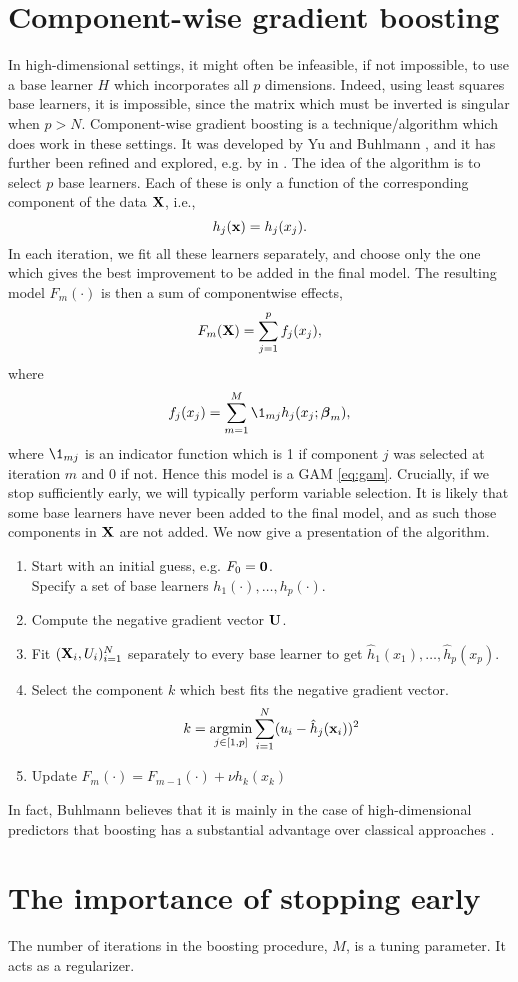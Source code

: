\section{Component-wise gradient boosting}
In high-dimensional settings, it might often be infeasible, if not impossible, to use a base learner $H$ which incorporates all $p$ dimensions. Indeed, using least squares base learners, it is impossible, since the matrix which must be inverted is singular when $p>N$. Component-wise gradient boosting is a technique/algorithm which does work in these settings. It was developed by Yu and Buhlmann \citep{buhlmann-yu}, and it has further been refined and explored, e.g. by \citeauthor{buhlmann2006} in \citeyear{buhlmann2006} \citep{buhlmann2006}. The idea of the algorithm is to select $p$ base learners. Each of these is only a function of the corresponding component of the data $\mathbf{X}$, i.e.,
\begin{equation*}
    h_j(\mathbf{x})=h_j(x_j).
\end{equation*}
In each iteration, we fit all these learners separately, and choose only the one which gives the best improvement to be added in the final model. The resulting model $F_m(\cdot)$ is then a sum of componentwise effects,
\begin{equation*}
    F_m(\mathbf{X})=\sum_{j=1}^pf_j(x_j),
\end{equation*}
where
\begin{equation*}
    f_j(x_j)=\sum_{m=1}^M\1_{mj}h_j(x_j;\bbeta_m),
\end{equation*}
where $\1_{mj}$ is an indicator function which is 1 if component $j$ was selected at iteration $m$ and 0 if not.
Hence this model is a GAM \eqref{eq:gam}. Crucially, if we stop sufficiently early, we will typically perform variable selection. It is likely that some base learners have never been added to the final model, and as such those components in $\mathbf{X}$ are not added. We now give a presentation of the algorithm.
\begin{enumerate}
    \item Start with an initial guess, e.g. $F_0=\mathbf{0}$.\\
    Specify a set of base learners $h_1(\cdot),\dotsc,h_p(\cdot)$.
    \item Compute the negative gradient vector $\mathbf{U}$.
    \item Fit $(\mathbf{X}_i,U_i)_{i=1}^N$ separately to every base learner to get $\hat{h}_1(x_1),\dotsc,\hat{h}_p(x_p)$.
    \item Select the component $k$ which best fits the negative gradient vector.
        \begin{equation*}
            k=\operatorname*{argmin}_{j\in[1,p]}\sum_{i=1}^N(u_i-\hat{h}_j(\mathbf{x}_i))^2
        \end{equation*}
    \item Update $F_m(\cdot)=F_{m-1}(\cdot)+\nu h_k(x_k)$
\end{enumerate}
In fact, Buhlmann believes that it is mainly in the case of high-dimensional predictors that boosting has a substantial advantage over classical approaches \citep{buhlmann2006}.

\section{The importance of stopping early}
The number of iterations in the boosting procedure, $M$, is a tuning parameter. It acts as a regularizer.